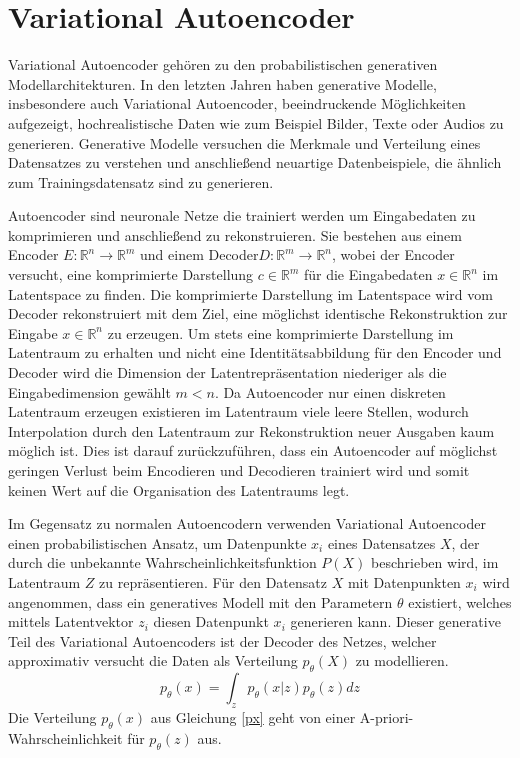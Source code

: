 \section{Variational Autoencoder}\raggedbottom
Variational Autoencoder \citep{kingma2014autoencoding} gehören zu den probabilistischen generativen Modellarchitekturen. In den letzten Jahren haben generative Modelle, insbesondere auch Variational Autoencoder, beeindruckende Möglichkeiten aufgezeigt, hochrealistische Daten wie zum Beispiel Bilder, Texte oder Audios zu generieren.
Generative Modelle versuchen die Merkmale und Verteilung eines Datensatzes zu verstehen und anschließend neuartige Datenbeispiele, die ähnlich zum Trainingsdatensatz sind zu generieren.

Autoencoder sind neuronale Netze die trainiert werden um Eingabedaten zu komprimieren und anschließend zu rekonstruieren. 
Sie bestehen aus einem Encoder $E:\mathbb{R}^n \rightarrow \mathbb{R}^m$ und einem Decoder$D:\mathbb{R}^m \rightarrow \mathbb{R}^n$, wobei der Encoder versucht, eine komprimierte Darstellung $c \in \mathbb{R}^{m}$ für die Eingabedaten $x \in \mathbb{R}^{n}$ im Latentspace zu finden. Die komprimierte Darstellung im Latentspace wird vom Decoder rekonstruiert mit dem Ziel, eine möglichst identische Rekonstruktion zur Eingabe $x \in \mathbb{R}^{n}$ zu erzeugen.
Um stets eine komprimierte Darstellung im Latentraum zu erhalten und nicht eine Identitätsabbildung für den Encoder und Decoder wird die Dimension der Latentrepräsentation niederiger als die Eingabedimension gewählt $m<n$. 
Da Autoencoder nur einen diskreten Latentraum erzeugen existieren im Latentraum viele leere Stellen, wodurch Interpolation durch den Latentraum zur Rekonstruktion neuer Ausgaben kaum möglich ist.
Dies ist darauf zurückzuführen, dass ein Autoencoder auf möglichst geringen Verlust beim Encodieren und Decodieren trainiert wird und somit keinen Wert auf die Organisation des Latentraums legt. 

Im Gegensatz zu normalen Autoencodern verwenden Variational Autoencoder einen probabilistischen Ansatz, um Datenpunkte $x_i$ eines Datensatzes $X$, der durch die unbekannte Wahrscheinlichkeitsfunktion $P(X)$ beschrieben wird, im Latentraum $Z$ zu repräsentieren. 
Für den Datensatz $X$ mit Datenpunkten $x_i$ wird angenommen, dass ein generatives Modell mit den Parametern $\theta$ existiert, welches mittels Latentvektor $z_i$ diesen Datenpunkt $x_i$ generieren kann.
Dieser generative Teil des Variational Autoencoders ist der Decoder des  Netzes, welcher approximativ versucht die Daten als Verteilung $p_\theta (X)$ zu modellieren.
\begin{equation}
    \label{px}
p_\theta (x) = \int_{z} p_\theta (x | z) p_\theta (z) dz
\end{equation}
Die Verteilung $p_\theta(x)$ aus Gleichung \ref{px} geht von einer A-priori-Wahrscheinlichkeit für $p_\theta (z)$ aus.


